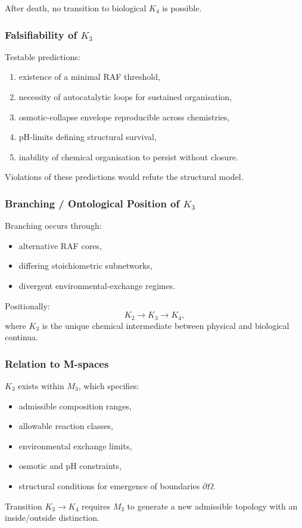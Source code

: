 After death, no transition to biological $K_4$ is possible.

\subsubsection{Falsifiability of \texorpdfstring{$K_3$}{K_3}}

Testable predictions:
\begin{enumerate}
    \item existence of a minimal RAF threshold,
    \item necessity of autocatalytic loops for sustained organisation,
    \item osmotic-collapse envelope reproducible across chemistries,
    \item pH-limits defining structural survival,
    \item inability of chemical organisation to persist without closure.
\end{enumerate}

Violations of these predictions would refute the structural model.

\subsubsection{Branching / Ontological Position of \texorpdfstring{$K_3$}{K_3}}

Branching occurs through:
\begin{itemize}
    \item alternative RAF cores,
    \item differing stoichiometric subnetworks,
    \item divergent environmental-exchange regimes.
\end{itemize}

Positionally:
\[
K_2 \to K_3 \to K_4,
\]
where $K_3$ is the unique chemical intermediate between physical and
biological continua.

\subsubsection{Relation to M-spaces}

$K_3$ exists within $M_3$, which specifies:
\begin{itemize}
    \item admissible composition ranges,
    \item allowable reaction classes,
    \item environmental exchange limits,
    \item osmotic and pH constraints,
    \item structural conditions for emergence of boundaries $\partial\Omega$.
\end{itemize}

Transition $K_3 \to K_4$ requires $M_3$ to generate a new admissible
topology with an inside/outside distinction.
